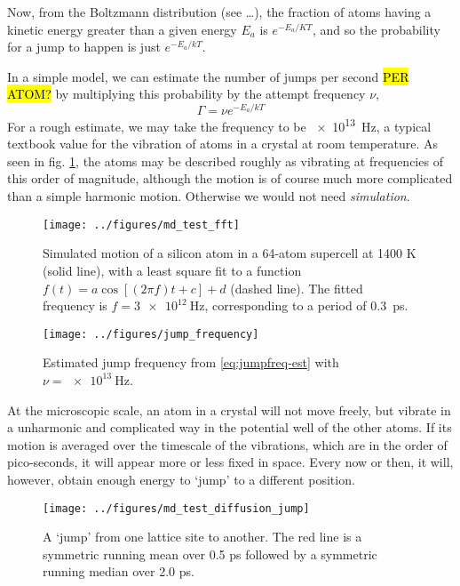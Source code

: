 \documentclass[11pt,bibliography=totoc,index=totoc]{scrbook}   %
\newcommand{\comment}[1]{\hl{#1}}
\begin{document}
Now, from the Boltzmann distribution (see \ldots), the fraction of atoms having a kinetic energy greater than a given energy $E_a$ is $e^{-E_a/KT}$, and so the probability for a jump to happen is just $e^{-E_a/kT}$. 

In a simple model, we can estimate the number of jumps per second \comment{PER ATOM?} by multiplying this probability by the attempt frequency $\nu$,
\begin{equation}
  \Gamma = \nu e^{-E_a/kT}
  \label{eq:jumpfreq-est}
\end{equation}
For a rough estimate, we may take the frequency to be \SI{e13}{\hertz}, a typical textbook value for the vibration of atoms in a crystal at room temperature.
As seen in fig. \ref{fig:figures/md_test_fft}, the atoms may be described roughly as vibrating at frequencies of this order of magnitude, although the motion is of course much more complicated than a simple harmonic motion. Otherwise we would not need \emph{simulation}.

\begin{figure}[htbp]
  \begin{center}
    \texttt{[image: ../figures/md\_test\_fft]}
  \end{center}
  \caption{
    Simulated motion of a silicon atom in a 64-atom supercell at 1400 K (solid line), 
    with a least square fit to a function $f(t) = a \cos[(2\pi f)t + c] + d$ (dashed line). 
    The fitted frequency is $f=\SI{3e12}{\hertz}$, corresponding to a period of 0.3~ps.
  }
  \label{fig:figures/md_test_fft}
\end{figure}

\begin{figure}[htbp]
  \begin{center}
    \texttt{[image: ../figures/jump\_frequency]}
  \end{center}
  \caption{Estimated jump frequency from \eqref{eq:jumpfreq-est} with $\nu=\SI{e13}{\hertz}$.}
  \label{fig:jumpfreq-est}
\end{figure}




At the microscopic scale, an atom in a crystal will not move freely, but vibrate in a unharmonic and complicated way in the potential well of the other atoms. 
If its motion is averaged over the timescale of the vibrations, which are in the order of pico-seconds, it will appear more or less fixed in space. 
Every now or then, it will, however, obtain enough energy to `jump' to a different position.

\begin{figure}[htbp]
  \begin{center}
    \texttt{[image: ../figures/md\_test\_diffusion\_jump]}
  \end{center}
  \caption{A `jump' from one lattice site to another. The red line is a symmetric running mean over 0.5 ps followed by a symmetric running median over 2.0 ps.}
  \label{fig:../figures/md_test_diffusion_jump}
\end{figure}
\end{document}
